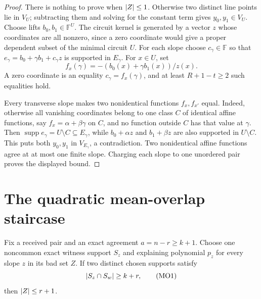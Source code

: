 \documentclass[11pt,a4paper]{amsart}
\numberwithin{equation}{section}
\theoremstyle{remark}
\DeclareMathOperator{\supp}{supp}\DeclareMathOperator{\Fib}{Fib}\DeclareMathOperator{\Sym}{Sym}
\newcommand{\F}{\mathbb F}\newcommand{\B}{\mathbb B}\newcommand{\K}{\mathbb K}\newcommand{\Z}{\mathbb Z}
\begin{document}
\begin{proof}
There is nothing to prove when \(\lvert Z\rvert\le1\).  Otherwise two distinct
line points lie in \(V_U\); subtracting them and solving for the constant
term gives \(y_0,y_1\in V_U\).  Choose lifts
\(b_0,b_1\in\F^U\).  The circuit kernel is generated by a vector
\(z\) whose coordinates are all nonzero, since a zero coordinate would
give a proper dependent subset of the minimal circuit \(U\).  For each slope choose
\(c_\gamma\in\F\) so that
\(e_\gamma=b_0+\gamma b_1+c_\gamma z\) is supported in
\(E_\gamma\).  For \(x\in U\), set
\[
             f_x(\gamma)=-(b_0(x)+\gamma b_1(x))/z(x).
\]
A zero coordinate is an equality \(c_\gamma=f_x(\gamma)\), and at least
\(R+1-t\ge2\) such equalities hold.

Every transverse slope makes two nonidentical functions \(f_x,f_{x'}\)
equal.  Indeed, otherwise all vanishing coordinates belong to one class
\(C\) of identical affine functions, say
\(f_x=\alpha+\beta\gamma\) on \(C\), and no function outside \(C\) has
that value at \(\gamma\).  Then
\(\supp e_\gamma=U\setminus C\subseteq E_\gamma\), while
\(b_0+\alpha z\) and \(b_1+\beta z\) are also supported in
\(U\setminus C\).  This puts both \(y_0,y_1\) in \(V_{E_\gamma}\), a
contradiction.  Two nonidentical affine functions agree at at most one
finite slope.  Charging each slope to one unordered pair proves the
displayed bound.
\end{proof}


\section{The quadratic mean-overlap staircase}\label{sec:mean-overlap-v3}
\begin{lemma}
\label{lem:large-overlap-collapse}
Fix a received pair and an exact agreement \(a=n-r\ge k+1\).  Choose one
noncommon exact witness support \(S_z\) and explaining polynomial \(p_z\)
for every slope \(z\) in its bad set \(Z\).  If two distinct chosen
supports satisfy
\[
                    \lvert S_z\cap S_w\rvert\ge k+r,       \tag{MO1}
\label{eq:large-overlap-collapse}
\]
then \(\lvert Z\rvert\le r+1\).
\end{lemma}
\end{document}
